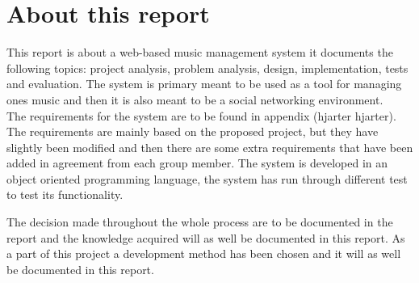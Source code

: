 \section{About this report}
This report is about a web-based music management system it documents the following topics: project analysis, problem analysis, design, implementation, tests and evaluation. The system is primary meant to be used as a tool for managing ones music and then it is also meant to be a social networking environment.\\
The requirements for the system are to be found in appendix (hjarter hjarter). The requirements are mainly based on the proposed project, but they have slightly been modified and then there are some extra requirements that have been added in agreement from each group member. The system is developed in an object oriented programming language, the system has run through different test to test its functionality.

The decision made throughout the whole process are to be documented in the report and the knowledge acquired will as well be documented in this report. As a part of this project a development method has been chosen and it will as well be documented in this report.